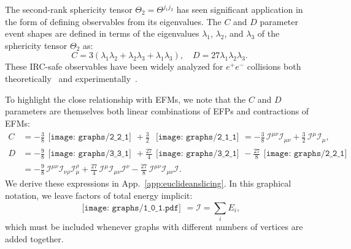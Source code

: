 \documentclass[aps,prd,floatfix,preprintnumbers,twocolumn,groupedaddress,nofootinbib,longbibliography,10pt]{revtex4-1}
\newcommand{\I}{\mathcal{I}}
\DeclareRobustCommand{\App}[1]{App.~\ref{#1}}
\DeclareRobustCommand{\dotgraph}[1]{\begin{gathered}\texttt{[image: graphs/1\_0\_1.pdf]}\end{gathered}}
\begin{document}
The second-rank sphericity tensor $\Theta_2=\Theta^{j_1j_2}$ has seen significant application in the form of defining observables from its eigenvalues.
%
The $C$ and $D$ parameter event shapes are defined in terms of the eigenvalues $\lambda_1$, $\lambda_2$, and $\lambda_3$ of the sphericity tensor $\Theta_2$ as:
%
\begin{equation}
\label{eq:cddef}
C = 3(\lambda_1\lambda_2 + \lambda_2\lambda_3 + \lambda_1\lambda_3), \quad D = 27 \lambda_1\lambda_2\lambda_3.
\end{equation}
%
These IRC-safe observables have been widely analyzed for $e^+e^-$ collisions both theoretically~\cite{Parisi:1978eg,Donoghue:1979vi,Ellis:1980wv,Catani:1998sf,Larkoski:2018cke} and experimentally~\cite{Ackerstaff:1997kk,Achard:2002kv,Heister:2003aj,Abdallah:2004xe,Bethke:2008hf}.


To highlight the close relationship with EFMs, we note that the $C$ and $D$ parameters are themselves both linear combinations of EFPs and contractions of EFMs:
%
\begin{align}\label{eq:Clor}
C  &= - \frac{3}{8} \begin{gathered}\texttt{[image: graphs/2\_2\_1]}\end{gathered} + \frac{3}{2}\,\,\begin{gathered}\texttt{[image: graphs/2\_1\_1]}\end{gathered}=-\frac{3}{8}\,\I^{\mu\nu}\I_{\mu\nu}+\frac32\,\I^\mu\I_\mu,\\
D &= -\frac{9}{8}\begin{gathered}\texttt{[image: graphs/3\_3\_1]}\end{gathered} + \frac{27}{4} \begin{gathered}\texttt{[image: graphs/3\_2\_1]}\end{gathered}-\frac{27}{8}\begin{gathered}\texttt{[image: graphs/2\_2\_1]}\end{gathered}\label{eq:Dlor}\\
&=-\frac98\,\I^{\mu\nu}\I_{\nu\rho}\I_{\mu}^\rho+\frac{27}{4}\,\I^\mu\I_{\mu\nu}\I^\nu-\frac{27}{8}\,\I^{\mu\nu}\I_{\mu\nu}\I.\nonumber
\end{align}
%
We derive these expressions in \App{app:euclideanslicing}.
%
In this graphical notation, we leave factors of total energy implicit:
%
\begin{equation}
\dotgraph{0.02} = \I = \sum_i E_i,
\end{equation} 
%
which must be included whenever graphs with different numbers of vertices are added together.
\end{document}
